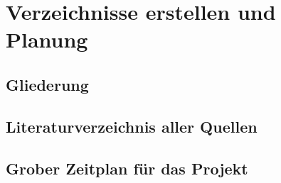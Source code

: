 \section{Verzeichnisse erstellen und Planung}

\subsection{Gliederung}
\lipsum[1-2]

\subsection{Literaturverzeichnis aller Quellen}
\lipsum[1-2]

\subsection{Grober Zeitplan für das Projekt}
\lipsum[1-2]